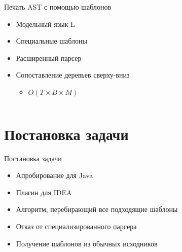 \documentclass[sans]{beamer}
\begin{document}
\begin{frame}{Печать AST с помощью шаблонов}
	\begin{itemize}
		\item Модельный язык L
		\item Специальные шаблоны
		\item Расширенный парсер
		\item Сопоставление деревьев сверху-вниз
		\begin{itemize}
			\item $O(T \times B \times M)$
		\end{itemize}
	\end{itemize}
	\begin{block}{}
		\inputminted{pascal}{codes/l_write.t}
	\end{block}
\end{frame}


\section{Постановка задачи}

\begin{frame}{Постановка задачи}
	\begin{itemize}
		\item Апробирование для Java
		\item Плагин для IDEA
		\item Алгоритм, перебирающий все подходящие шаблоны
	\end{itemize}
	\pause
	\begin{itemize}
		\item Отказ от специализированного парсера
		\item Получение шаблонов из обычных исходников
	\end{itemize}
\end{frame}
\end{document}
